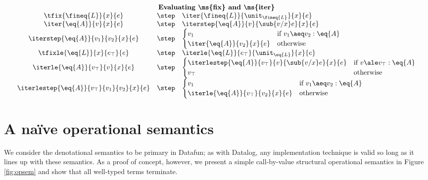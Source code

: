 \begin{figure*}
\begin{displaymath}
\begin{array}{ccl}
      \vspace{1em}\\
      \multicolumn{3}{c}{\textbf{Evaluating \ms{fix} and \ms{iter}}}\\
      \tfix{\fineq{L}}{x}{e} &\step& \iter{\fineq{L}}{\unit_{\fineq{L}}}{x}{e}\\
      \iter{\eq{A}}{v}{x}{e} &\step& \iterstep{\eq{A}}{v}{\sub{v/x} e}{x}{e}\\
      \iterstep{\eq{A}}{v_1}{v_2}{x}{e}
      &\step& \begin{cases}
        v_1 & \text{if}~{v_1 \aeq v_2 : \eq{A}}\\
        \iter{\eq{A}}{v_2}{x}{e} & \text{otherwise}
      \end{cases}\\
      \tfixle{\eq{L}}{x}{e_\top}{e} &\step& \iterle{\eq{L}}{e_\top}{\unit_{\eq{L}}}{x}{e}\\
      \iterle{\eq{A}}{v_\top}{v}{x}{e}
      &\step& \begin{cases}
        \iterlestep{\eq{A}}{v_\top}{v}{\sub{v/x} e}{x}{e} & \text{if}~{v \ale v_\top : \eq{A}}\\
        v_\top & \text{otherwise}
      \end{cases}\\
      \iterlestep{\eq{A}}{v_\top}{v_1}{v_2}{x}{e}
      &\step& \begin{cases}
        v_1 &\text{if}~{v_1 \aeq v_2 : \eq{A}}\\
        \iterle{\eq{A}}{v_\top}{v_2}{x}{e} & \text{otherwise}
      \end{cases}
    \end{array}
  \end{displaymath}

  \caption{Operational semantics}
  \label{fig:opsem}
\end{figure*}


\section{A na\"ive operational semantics}

We consider the denotational semantics to be primary in Datafun; as with
Datalog, any implementation technique is valid so long as it lines up with these
semantics. As a proof of concept, however, we present a simple call-by-value
structural operational semantics in Figure \ref{fig:opsem} and show that all
well-typed terms terminate.

